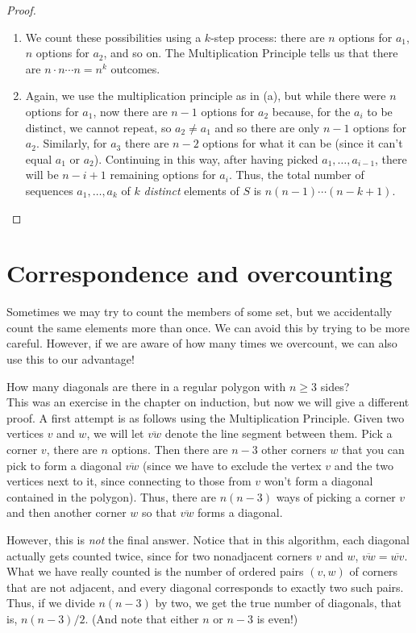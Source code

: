 \documentclass[11pt,dvipsnames]{book}
\numberwithin{figure}{section} %
\numberwithin{table}{section} %
\begin{document}
\begin{proof}
\begin{enumerate}[label=(\alph*)]
\item We count these possibilities using a $k$-step process: there are $n$ options for $a_1$, $n$ options for $a_2$, and so on. The Multiplication Principle tells us that there are $n\cdot n\cdots n = n^{k}$ outcomes.
\item Again, we use the multiplication principle as in (a), but while there were $n$ options for $a_1$, now there are $n-1$ options for $a_2$ because, for the $a_i$ to be distinct, we cannot repeat, so $a_{2}\neq a_{1}$ and so there are only $n-1$ options for $a_2$. Similarly, for $a_{3}$ there are $n-2$ options for what it can be (since it can't equal $a_{1}$ or $a_{2}$). Continuing in this way, after having picked $a_{1},\dots,a_{i-1}$, there will be $n-i+1$ remaining options for $a_i$. Thus, the total number of sequences $a_{1}, \dots ,a_{k}$ of $k$ {\it distinct} elements of $S$ is $n(n-1)\cdots (n-k+1) $.
\end{enumerate}
\end{proof}

\section{Correspondence and overcounting}

\indent Sometimes we may try to count the members of some set, but we accidentally count the same elements more than once. We can avoid this by trying to be more careful. However, if we are aware of how many times we overcount, we can also use this to our advantage!

\begin{example}
How many diagonals are there in a regular polygon with $n \geq 3$ sides?\\

This was an exercise in the chapter on induction, but now we will give a different proof. A first attempt is as follows using the Multiplication Principle. Given two vertices $v$ and $w$, we will let $\overline{vw}$ denote the line segment between them. Pick a corner $v$, there are $n$ options. Then there are $n-3$ other corners $w$ that you can pick to form a diagonal $\overline{vw}$ (since we have to exclude the vertex $v$ and the two vertices next to it, since connecting to those from $v$ won't form a diagonal contained in the polygon). Thus, there are $n(n-3)$ ways of picking a corner $v$ and then another corner $w$ so that $\overline{vw}$ forms a diagonal.

However, this is {\it not} the final answer. Notice that in this algorithm, each diagonal actually gets counted twice, since for two nonadjacent corners $v$ and $w$, $\overline{vw}=\overline{wv}$. What we have really counted is the number of ordered pairs $(v,w)$ of corners that are not adjacent, and every diagonal corresponds to exactly two such pairs. Thus, if we divide $n(n-3)$ by two, we get the true number of diagonals, that is, $n(n-3)/2$. (And note that either $n$ or $n-3$ is even!)
\end{example}
\end{document}
